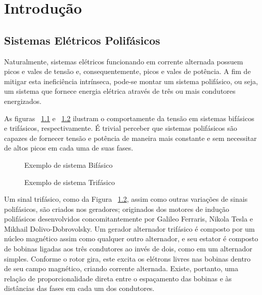 \documentclass[12pt,a4paper,openany]{abntex2}
\begin{document}
	
\imprimircapa	
\imprimirfolhaderosto

\clearpage
\cleardoublepage
\cleardoublepage

\setcounter{page}{3}

\tableofcontents
\clearpage{\pagestyle{empty}\cleardoublepage}

\listoffigures
\clearpage{\pagestyle{empty}\cleardoublepage}
	
\chapter{Introdução}

\section{Sistemas Elétricos Polifásicos}

Naturalmente, sistemas elétricos funcionando em corrente alternada possuem picos e vales de tensão e, consequentemente, picos e vales de potência. A fim de mitigar esta ineficiência intrínseca, pode-se montar um sistema polifásico, ou seja, um sistema que fornece energia elétrica através de três ou mais condutores energizados.

As figuras ~\ref{fig:sinal-bifasico} e ~\ref{fig:sinal-trifasico} ilustram o comportamente da tensão em sistemas bifásicos e trifásicos, respectivamente. É trivial perceber que sistemas polifásicos são capazes de fornecer tensão e potência de maneira mais constante e sem necessitar de altos picos em cada uma de suas fases.

\begin{figure}[!htp]
	\centering
	\caption{Exemplo de sistema Bifásico}
	\label{fig:sinal-bifasico}
\end{figure}

\begin{figure}[!htp]
	\centering
	\caption{Exemplo de sistema Trifásico}
	\label{fig:sinal-trifasico}
\end{figure}

Um sinal trifásico, como da Figura ~\ref{fig:sinal-trifasico}, assim como outras variações de sinais polifásicos, são criados nos geradores; originados dos motores de indução polifásicos desenvolvidos concomitantemente por Galileo Ferraris, Nikola Tesla e Mikhail Dolivo-Dobrovolsky. Um gerador alternador trifásico é composto por um núcleo magnético assim como qualquer outro alternador, e seu estator é composto de bobinas ligadas aos três condutores ao invés de dois, como em um alternador simples. Conforme o rotor gira, este excita os elétrons livres nas bobinas dentro de seu campo magnético, criando corrente alternada. Existe, portanto, uma relação de proporcionalidade direta entre o espaçamento das bobinas e às distâncias das fases em cada um dos condutores.
\end{document}
